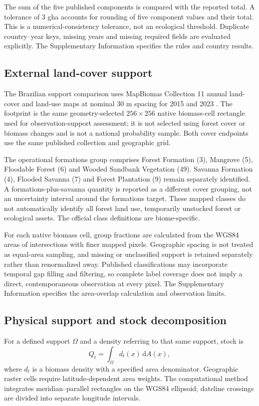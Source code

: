 \documentclass[11pt,a4paper]{article}
\begin{document}
The sum of the five published components is compared with the reported total. A tolerance of 3 gha accounts for rounding of five component values and their total. This is a numerical-consistency tolerance, not an ecological threshold. Duplicate country--year keys, missing years and missing required fields are evaluated explicitly. The Supplementary Information specifies the rules and country results.

\subsection{External land-cover support}
The Brazilian support comparison uses MapBiomas Collection 11 annual land-cover and land-use maps at nominal 30 m spacing for 2015 and 2023 \citep{MapBiomas2026}. The footprint is the same geometry-selected $256\times256$ native biomass-cell rectangle used for observation-support assessment; it is not selected using forest cover or biomass changes and is not a national probability sample. Both cover endpoints use the same published collection and geographic grid.

The operational formations group comprises Forest Formation (3), Mangrove (5), Floodable Forest (6) and Wooded Sandbank Vegetation (49). Savanna Formation (4), Flooded Savanna (7) and Forest Plantation (9) remain separately identified. A formations-plus-savanna quantity is reported as a different cover grouping, not an uncertainty interval around the formations target. These mapped classes do not automatically identify all forest land use, temporarily unstocked forest or ecological assets. The official class definitions are biome-specific.

For each native biomass cell, group fractions are calculated from the WGS84 areas of intersections with finer mapped pixels. Geographic spacing is not treated as equal-area sampling, and missing or unclassified support is retained separately rather than renormalized away. Published classifications may incorporate temporal gap filling and filtering, so complete label coverage does not imply a direct, contemporaneous observation at every pixel. The Supplementary Information specifies the area-overlap calculation and observation limits.

\subsection{Physical support and stock decomposition}
For a defined support $\Omega$ and a density referring to that same support, stock is
\[
Q_t=\int_{\Omega} d_t(x)\,\mathrm dA(x),
\]
where $d_t$ is a biomass density with a specified area denominator. Geographic raster cells require latitude-dependent area weights. The computational method integrates meridian--parallel rectangles on the WGS84 ellipsoid; dateline crossings are divided into separate longitude intervals.
\end{document}
